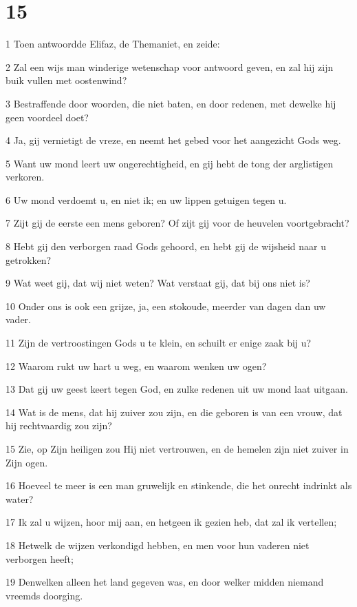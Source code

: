\chapter{15}

\par 1 Toen antwoordde Elifaz, de Themaniet, en zeide:
\par 2 Zal een wijs man winderige wetenschap voor antwoord geven, en zal hij zijn buik vullen met oostenwind?
\par 3 Bestraffende door woorden, die niet baten, en door redenen, met dewelke hij geen voordeel doet?
\par 4 Ja, gij vernietigt de vreze, en neemt het gebed voor het aangezicht Gods weg.
\par 5 Want uw mond leert uw ongerechtigheid, en gij hebt de tong der arglistigen verkoren.
\par 6 Uw mond verdoemt u, en niet ik; en uw lippen getuigen tegen u.
\par 7 Zijt gij de eerste een mens geboren? Of zijt gij voor de heuvelen voortgebracht?
\par 8 Hebt gij den verborgen raad Gods gehoord, en hebt gij de wijsheid naar u getrokken?
\par 9 Wat weet gij, dat wij niet weten? Wat verstaat gij, dat bij ons niet is?
\par 10 Onder ons is ook een grijze, ja, een stokoude, meerder van dagen dan uw vader.
\par 11 Zijn de vertroostingen Gods u te klein, en schuilt er enige zaak bij u?
\par 12 Waarom rukt uw hart u weg, en waarom wenken uw ogen?
\par 13 Dat gij uw geest keert tegen God, en zulke redenen uit uw mond laat uitgaan.
\par 14 Wat is de mens, dat hij zuiver zou zijn, en die geboren is van een vrouw, dat hij rechtvaardig zou zijn?
\par 15 Zie, op Zijn heiligen zou Hij niet vertrouwen, en de hemelen zijn niet zuiver in Zijn ogen.
\par 16 Hoeveel te meer is een man gruwelijk en stinkende, die het onrecht indrinkt als water?
\par 17 Ik zal u wijzen, hoor mij aan, en hetgeen ik gezien heb, dat zal ik vertellen;
\par 18 Hetwelk de wijzen verkondigd hebben, en men voor hun vaderen niet verborgen heeft;
\par 19 Denwelken alleen het land gegeven was, en door welker midden niemand vreemds doorging.
